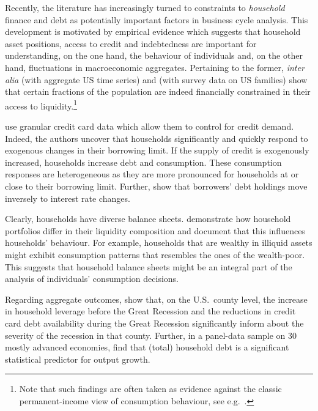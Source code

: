\documentclass[12pt]{article} %
\numberwithin{equation}{section} %
\numberwithin{figure}{section}
\numberwithin{table}{section}
\begin{document}
Recently, the literature has increasingly turned to constraints to \textit{household} finance and debt as potentially important factors in business cycle analysis. This development is motivated by empirical evidence which suggests that household asset positions, access to credit and indebtedness are important for understanding, on the one hand, the behaviour of individuals and, on the other hand, fluctuations in macroeconomic aggregates. Pertaining to the former, \textit{inter alia} \textcite{campbell1989} (with aggregate US time series) and \textcite{zeldes1989} (with survey data on US families) show that certain fractions of the population are indeed financially constrained in their access to liquidity.\footnote{Note that such findings are often taken as evidence against the classic permanent-income view of consumption behaviour, see e.g.~\textcite{kaplan2014}.}

\textcite{gross2002} use granular credit card data which allow them to control for credit demand. Indeed, the authors uncover that households significantly and quickly respond to exogenous changes in their borrowing limit. If the supply of credit is exogenously increased, households increase debt and consumption. These consumption responses are heterogeneous as they are more pronounced for households at or close to their borrowing limit. Further, \textcite{gross2002} show that borrowers' debt holdings move inversely to interest rate changes.

Clearly, households have diverse balance sheets. \textcite{kaplan2014} demonstrate how household portfolios differ in their liquidity composition and document that this influences households' behaviour. For example, households that are wealthy in illiquid assets might exhibit consumption patterns that resembles the ones of the wealth-poor. This suggests that household balance sheets might be an integral part of the analysis of individuals' consumption decisions.

Regarding aggregate outcomes, \textcite{mian2010} show that, on the U.S.~county level, the increase in household leverage before the Great Recession and the reductions in credit card debt availability during the Great Recession significantly inform about the severity of the recession in that county. Further, in a panel-data sample on 30 mostly advanced economies, \textcite{mian2017} find that (total) household debt is a significant statistical predictor for output growth.

\end{document}
